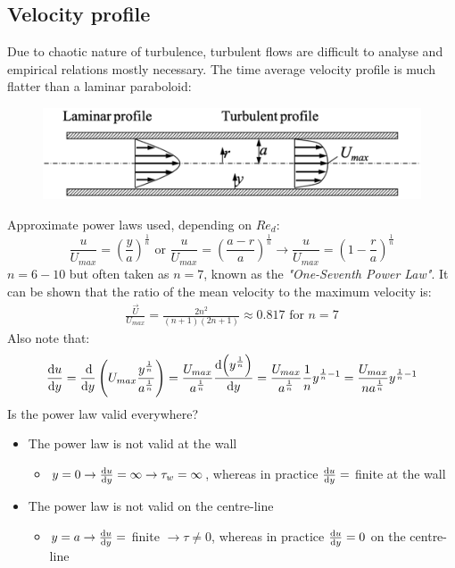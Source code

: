 \documentclass[class=report, crop=false, 12pt,a4paper]{standalone}
\begin{document}
\subsection{Velocity profile}
Due to chaotic nature of turbulence, turbulent flows are difficult to analyse and empirical relations mostly necessary. The time average velocity profile is much flatter than a laminar paraboloid:
\begin{figure}[H]
  \centering
  \includegraphics[width = 0.7 \textwidth]{../img/diagram84.png}
  \caption{}
\end{figure}
Approximate power laws used, depending on $Re_d$:
\begin{equation}
  \frac{u}{U_{max}} = \left( \frac{y}{a}\right)^{\frac{1}{n}} \textrm{ or } \frac{u}{U_{max}} = \left(\frac{a-r}{a}\right)^{\frac{1}{n}} \rightarrow \frac{u}{U_{max}} = \left(1-\frac{r}{a}\right)^{\frac{1}{n}}
\end{equation}
$n = 6-10$ but often taken as $n=7$, known as the \textit{"One-Seventh Power Law"}. It can be shown that the ratio of the mean velocity to the maximum velocity is:
\begin{align}
  \frac{\vec{U}}{U_{max}} = \frac{2n^2}{\left(n+1\right)\left(2n+1\right)}\approx 0.817 \textrm{ for }n=7
\end{align}
Also note that:
\begin{align}
  \frac{\dif u}{\dif y} = \frac{\dif}{\dif y}\left(U_{max} \frac{y^{\frac{1}{n}}}{a^{\frac{1}{n}}}\right) = \frac{U_{max}}{a^{\frac{1}{n}}} \frac{\dif\left(y^{\frac{1}{n}}\right)}{\dif y} = \frac{U_{max}}{a^{\frac{1}{n}}}\frac{1}{n}y^{\frac{1}{n}-1} = \frac{U_{max}}{na^{\frac{1}{n}}}y^{\frac{1}{n}-1}
\end{align}
Is the power law valid everywhere?
\begin{itemize}
  \item The power law is not valid at the wall
  \begin{itemize}
    \item $y = 0 \rightarrow \frac{\dif u}{\dif y} = \infty \rightarrow \tau_w = \infty$, whereas in practice $\frac{\dif u}{\dif y} =$ finite at the wall
  \end{itemize}
  \item The power law is not valid on the centre-line
  \begin{itemize}
    \item $y = a \rightarrow \frac{\dif u}{\dif y} =$ finite $\rightarrow \tau \neq 0$, whereas in practice $\frac{\dif u}{\dif y}= 0$ on the centre-line
  \end{itemize}
\end{itemize}
\end{document}
